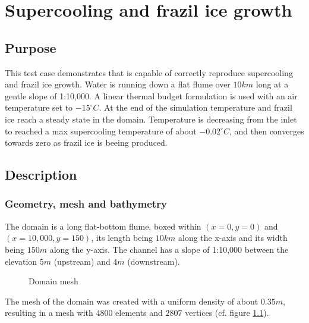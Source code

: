 \renewcommand{\labelitemi}{$\triangleright$}

\chapter{Supercooling and frazil ice growth}
%
%
\section{Purpose}
This test case demonstrates that \khione is capable of correctly reproduce
supercooling and frazil ice growth.
Water is running down a flat flume over $10km$ long at a gentle slope of 1:10,000. A linear thermal budget formulation is used with an air temperature set to $-15^{\circ} C$. At the end of the simulation temperature and frazil ice reach a steady state in the domain. Temperature is decreasing from the inlet to reached a max supercooling temperature of about $-0.02^{\circ} C$, and then converges towards zero as frazil ice is beeing produced.

\section{Description}

\subsection{Geometry, mesh and bathymetry}
The domain is a long flat-bottom flume, boxed within $(x=0, y=0)$ and $(x=10,000, y=150)$, its length being $10km$ along the x-axis and its width being $150m$ along the y-axis. The channel has a slope of 1:10,000 between the elevation $5m$ (upstream) and $4m$ (downstream).

\begin{figure}[H]
    \begin{center}
    \end{center}
    \caption{Domain mesh}
    \label{fig:growth_mesh}
\end{figure}

The mesh of the domain was created with a uniform density of about $0.35m$, resulting in a mesh with $4800$ elements and $2807$ vertices (cf. figure \ref{fig:growth_mesh}).

